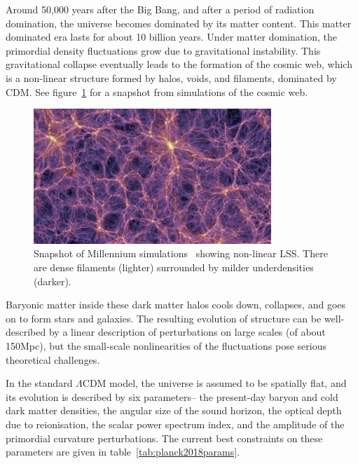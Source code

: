 Around 50,000 years after the Big Bang, and after a period of radiation domination, the universe becomes dominated by its matter content. This matter dominated era lasts for about 10 billion years. Under matter domination, the primordial density fluctuations grow due to gravitational instability. This gravitational collapse eventually leads to the formation of the cosmic web, which is a non-linear structure formed by halos, voids, and filaments, dominated by CDM. See figure~\ref{fig:millennium} for a snapshot from simulations of the cosmic web. 

\begin{figure}[ht!]
	\centering
	\includegraphics[width=0.8\textwidth]{fig/Millennium.png}
	\caption{Snapshot of Millennium simulations~\cite{Springel:2005nw} showing non-linear LSS. There are dense filaments (lighter) surrounded by milder underdensities (darker). }
	\label{fig:millennium}
\end{figure}

Baryonic matter inside these dark matter halos cools down, collapses, and goes on to form stars and galaxies. The resulting evolution of structure can be well-described by a linear description of perturbations on large scales (of about 150Mpc), but the small-scale nonlinearities of the fluctuations pose serious theoretical challenges.

In the standard $\Lambda$CDM model, the universe is assumed to be spatially flat, and its evolution is described by six parameters-- the present-day baryon and cold dark matter densities, the angular size of the sound horizon, the optical depth due to reionisation, the scalar power spectrum index, and the amplitude of the primordial curvature perturbations. The current best constraints on these parameters are given in table~\ref{tab:planck2018params}.

